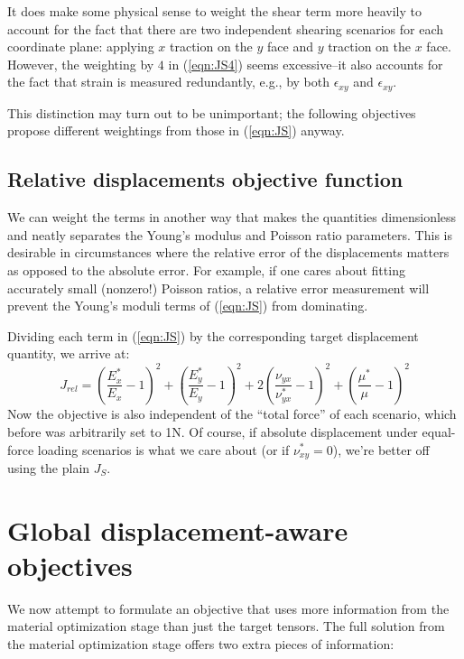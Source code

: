 \documentclass[10pt]{article}
\begin{document}
It does make some physical sense to weight the shear term more heavily to
account for the fact that there are two independent shearing scenarios for each
coordinate plane: applying $x$ traction on the $y$ face and $y$ traction on the
$x$ face. However, the weighting by $4$ in (\ref{eqn:JS4}) seems excessive--it
also accounts for the fact that strain is measured redundantly, e.g., by both
$\epsilon_{xy}$ and $\epsilon_{xy}$.


This distinction may turn out to be unimportant; the following objectives
propose different weightings from those in (\ref{eqn:JS}) anyway.

\subsection{Relative displacements objective function}
We can weight the terms in another way that makes the quantities dimensionless
and neatly separates the Young's modulus and Poisson ratio parameters. This is
desirable in circumstances where the relative error of the displacements matters
as opposed to the absolute error. For example, if one cares about fitting
accurately small (nonzero!) Poisson ratios, a relative error measurement will
prevent the Young's moduli terms of (\ref{eqn:JS}) from dominating.

Dividing each term in (\ref{eqn:JS}) by the corresponding target displacement
quantity, we arrive at:
$$
J_{rel} = \left(\frac{E_x^*}{E_x} - 1 \right)^2 + \left(\frac{E_y^*}{E_y} - 1 \right)^2
    + 2 \left(\frac{\nu_{yx}}{\nu_{yx}^*} - 1 \right)^2
    + \left(\frac{\mu^*}{\mu} - 1 \right)^2
$$
Now the objective is also independent of the ``total force'' of each scenario,
which before was arbitrarily set to 1N.
Of course, if absolute displacement under equal-force loading scenarios is what we
care about (or if $\nu_{xy}^* = 0$), we're better off using the plain $J_S$.

\section{Global displacement-aware objectives}
We now attempt to formulate an objective that uses more information from the
material optimization stage than just the target tensors. The full solution
from the material optimization stage offers two extra pieces of information:
\end{document}
